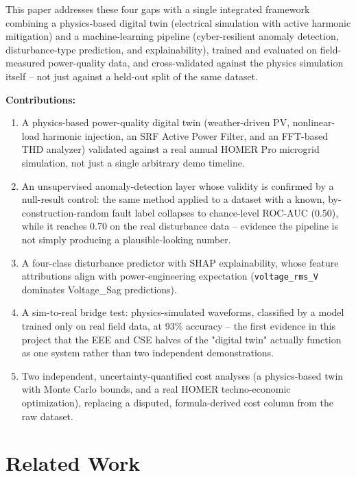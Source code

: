 \documentclass[conference]{IEEEtran}
\begin{document}
This paper addresses these four gaps with a single integrated
framework combining a physics-based digital twin (electrical
simulation with active harmonic mitigation) and a machine-learning
pipeline (cyber-resilient anomaly detection, disturbance-type
prediction, and explainability), trained and evaluated on
field-measured power-quality data, and cross-validated against the
physics simulation itself -- not just against a held-out split of the
same dataset.

\textbf{Contributions:}
\begin{enumerate}
\item A physics-based power-quality digital twin (weather-driven PV,
  nonlinear-load harmonic injection, an SRF Active Power Filter, and
  an FFT-based THD analyzer) validated against a real annual HOMER
  Pro microgrid simulation, not just a single arbitrary demo timeline.
\item An unsupervised anomaly-detection layer whose validity is
  confirmed by a null-result control: the same method applied to a
  dataset with a known, by-construction-random fault label collapses
  to chance-level ROC-AUC (0.50), while it reaches 0.70 on the real
  disturbance data -- evidence the pipeline is not simply producing a
  plausible-looking number.
\item A four-class disturbance predictor with SHAP explainability,
  whose feature attributions align with power-engineering expectation
  (\texttt{voltage\_rms\_V} dominates Voltage\_Sag predictions).
\item A sim-to-real bridge test: physics-simulated waveforms,
  classified by a model trained only on real field data, at 93\%
  accuracy -- the first evidence in this project that the EEE and CSE
  halves of the "digital twin" actually function as one system rather
  than two independent demonstrations.
\item Two independent, uncertainty-quantified cost analyses (a
  physics-based twin with Monte Carlo bounds, and a real HOMER
  techno-economic optimization), replacing a disputed,
  formula-derived cost column from the raw dataset.
\end{enumerate}

\section{Related Work}
\end{document}
